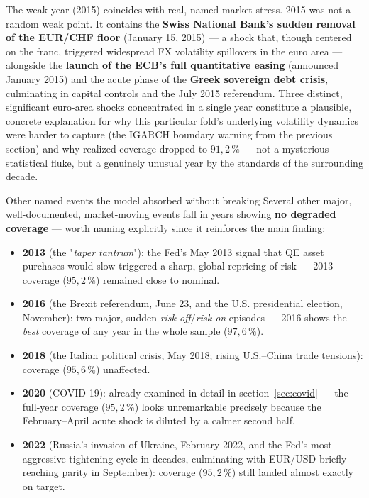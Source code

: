 \documentclass[12pt,a4paper]{article}
\begin{document}
	\begin{econbox}
		The weak year (2015) coincides with real, named market stress.
		2015 was not a random weak point. It contains the
		\textbf{Swiss National Bank's sudden removal of the
			EUR/CHF floor} (January 15, 2015) --- a shock that,
		though centered on the franc, triggered widespread FX
		volatility spillovers in the euro area --- alongside the
		\textbf{launch of the ECB's full quantitative easing}
		(announced January 2015) and the acute phase of the
		\textbf{Greek sovereign debt crisis},
		culminating in capital controls and the July 2015
		referendum. Three distinct, significant euro-area shocks
		concentrated in a single year constitute a plausible, concrete
		explanation for why this particular fold's underlying
		volatility dynamics were harder to capture
		(the IGARCH boundary warning from the previous section) and
		why realized coverage dropped to $91{,}2\,\%$ --- not a
		mysterious statistical fluke, but a genuinely unusual year by
		the standards of the surrounding decade.
	\end{econbox}
	
	\newpage
	
	\begin{econbox}Other named events the model absorbed without breaking
		Several other major, well-documented,
		market-moving events fall in years showing
		\textbf{no degraded coverage} --- worth naming explicitly since it
		reinforces the main finding:
		\begin{itemize}
			\item \textbf{2013} (the "\emph{taper tantrum}"): the
			Fed's May 2013 signal that QE asset purchases would
			slow triggered a sharp, global repricing of risk ---
			2013 coverage ($95{,}2\,\%$) remained close to
			nominal.
			\item \textbf{2016} (the Brexit referendum, June 23, and the
			U.S. presidential election, November): two major, sudden
			\emph{risk-off}/\emph{risk-on} episodes --- 2016 shows the
			\emph{best} coverage of any year in the whole sample
			($97{,}6\,\%$).
			\item \textbf{2018} (the Italian political crisis, May 2018;
			rising U.S.--China trade tensions): coverage
			($95{,}6\,\%$) unaffected.
			\item \textbf{2020} (COVID-19): already examined in detail
			in section~\ref{sec:covid} --- the full-year coverage
			($95{,}2\,\%$) looks unremarkable precisely because the
			February--April acute shock is diluted by a calmer
			second half.
			\item \textbf{2022} (Russia's invasion of Ukraine,
			February 2022, and the Fed's most aggressive
			tightening cycle in decades, culminating with EUR/USD
			briefly reaching parity in September): coverage
			($95{,}2\,\%$) still landed almost exactly on
			target.
		\end{itemize}
	\end{econbox}
	
\end{document}
